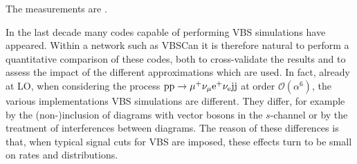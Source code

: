 The measurements are \cite{Aad:2014zda,Aaboud:2016ffv,Khachatryan:2014sta}.

In the last decade many codes capable of performing VBS simulations have appeared.
Within a network such as VBSCan it is therefore natural to perform 
a quantitative comparison of these codes, both to cross-validate the results and to assess the impact of the different approximations which are used.
In fact, already at LO, when considering the process ${\rm p}{\rm p}\to\mu^+\nu_\mu{\rm e}^+\nu_{\rm e}{\rm j}{\rm j}$ at order $\mathcal O (\alpha^6)$, the various implementations VBS simulations are different.
They differ, for example
by the (non-)inclusion of diagrams with vector bosons in the $s$-channel or by the treatment of interferences between diagrams.
The reason of these differences is that, 
when typical signal cuts for VBS are imposed, these effects turn to be small on rates and distributions.
